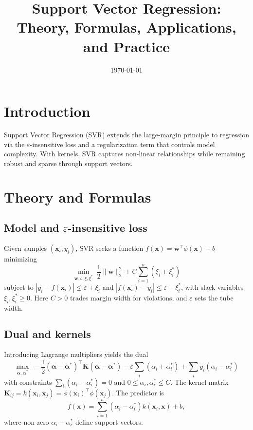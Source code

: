 \documentclass{article}
\title{Support Vector Regression: Theory, Formulas, Applications, and Practice}
\author{}
\date{\today}
\begin{document}
\maketitle

\section{Introduction}
Support Vector Regression (SVR) extends the large-margin principle to regression via the \(\varepsilon\)-insensitive loss and a regularization term that controls model complexity. With kernels, SVR captures non-linear relationships while remaining robust and sparse through support vectors.

\section{Theory and Formulas}
\subsection{Model and \(\varepsilon\)-insensitive loss}
Given samples \((\mathbf{x}_i,y_i)\), SVR seeks a function \(f(\mathbf{x})=\mathbf{w}^\top\phi(\mathbf{x})+b\) minimizing
\begin{equation}
\min_{\mathbf{w},b,\xi,\xi^*} \; \frac{1}{2}\lVert\mathbf{w}\rVert_2^2 + C\sum_{i=1}^n (\xi_i+\xi^*_i)
\end{equation}
subject to \(|y_i - f(\mathbf{x}_i)| \le \varepsilon + \xi_i\) and \(|f(\mathbf{x}_i)-y_i| \le \varepsilon + \xi_i^*\), with slack variables \(\xi_i,\xi_i^*\ge 0\). Here \(C>0\) trades margin width for violations, and \(\varepsilon\) sets the tube width.

\subsection{Dual and kernels}
Introducing Lagrange multipliers yields the dual
\begin{equation}
\max_{\bm{\alpha},\bm{\alpha}^*} \; -\frac{1}{2}(\bm{\alpha}-\bm{\alpha}^*)^\top \mathbf{K}(\bm{\alpha}-\bm{\alpha}^*) - \varepsilon \sum_i (\alpha_i+\alpha_i^*) + \sum_i y_i(\alpha_i-\alpha_i^*)
\end{equation}
with constraints \(\sum_i (\alpha_i-\alpha_i^*)=0\) and \(0\le \alpha_i,\alpha_i^*\le C\). The kernel matrix \(\mathbf{K}_{ij}=k(\mathbf{x}_i,\mathbf{x}_j)=\phi(\mathbf{x}_i)^\top\phi(\mathbf{x}_j)\). The predictor is
\begin{equation}
f(\mathbf{x}) = \sum_{i=1}^n (\alpha_i-\alpha_i^*) k(\mathbf{x}_i,\mathbf{x}) + b,
\end{equation}
where non-zero \(\alpha_i-\alpha_i^*\) define support vectors.
\end{document}
